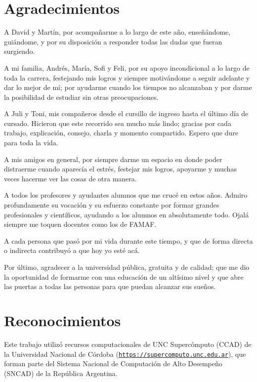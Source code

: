 \documentclass[a4paper,12pt,spanish]{book}
\begin{document}

\cleardoublepage


\clearpage

\thispagestyle{empty}
\chapter*{Agradecimientos}
A David y Martín, por acompañarme a lo largo de este año, enseñándome, guiándome,
y por su disposición a responder todas las dudas que fueran surgiendo.

A mi familia, Andrés, María, Sofi y Feli, por su apoyo incondicional a lo largo de
toda la carrera, festejando mis logros y siempre motivándome a seguir adelante y
dar lo mejor de mí; por ayudarme cuando los tiempos no alcanzaban y por darme la
posibilidad de estudiar sin otras preocupaciones.

A Juli y Toni, mis compañeros desde el cursillo de ingreso hasta el último día de
cursado. Hicieron que este recorrido sea mucho más lindo; gracias por cada trabajo,
explicación, consejo, charla y momento compartido. Espero que dure para toda la vida.

A mis amigos en general, por siempre darme un espacio en donde poder distraerme
cuando aparecía el estrés, festejar mis logros, apoyarme y muchas veces hacerme ver
las cosas de otra manera.

A todos los profesores y ayudantes alumnos que me crucé en estos años. Admiro
profundamente su vocación y su esfuerzo constante por formar grandes profesionales y
científicos, ayudando a los alumnos en absolutamente todo. Ojalá siempre me toquen
docentes como los de FAMAF.

A cada persona que pasó por mi vida durante este tiempo, y que de forma directa
o indirecta contribuyó a que hoy yo esté acá.

Por último, agradecer a la universidad pública, gratuita y de calidad; que me dio
la oportunidad de formarme con una educación de un altísimo nivel y que abre las
puertas a todas las personas para que puedan alcanzar sus sueños.
\clearpage

\thispagestyle{empty}
\chapter*{Reconocimientos}
Este trabajo utilizó recursos computacionales de UNC Supercómputo (CCAD) de la Universidad
Nacional de Córdoba
(\href{https://supercomputo.unc.edu.ar}{\texttt{https://supercomputo.unc.edu.ar}}), que forman
parte del Sistema Nacional de Computación de Alto Desempeño (SNCAD) de la República
Argentina.
\end{document}

